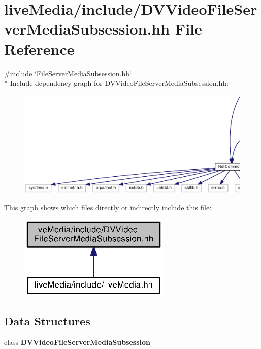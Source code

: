 \section{live\+Media/include/\+D\+V\+Video\+File\+Server\+Media\+Subsession.hh File Reference}
\label{DVVideoFileServerMediaSubsession_8hh}
{\ttfamily \#include \char`\"{}File\+Server\+Media\+Subsession.\+hh\char`\"{}}\\*
Include dependency graph for D\+V\+Video\+File\+Server\+Media\+Subsession.\+hh\+:
\nopagebreak
\begin{figure}[H]
\begin{center}
\leavevmode
\includegraphics[width=350pt]{DVVideoFileServerMediaSubsession_8hh__incl}
\end{center}
\end{figure}
This graph shows which files directly or indirectly include this file\+:
\nopagebreak
\begin{figure}[H]
\begin{center}
\leavevmode
\includegraphics[width=205pt]{DVVideoFileServerMediaSubsession_8hh__dep__incl}
\end{center}
\end{figure}
\subsection*{Data Structures}
\begin{DoxyCompactItemize}
\item 
class {\bf D\+V\+Video\+File\+Server\+Media\+Subsession}
\end{DoxyCompactItemize}
